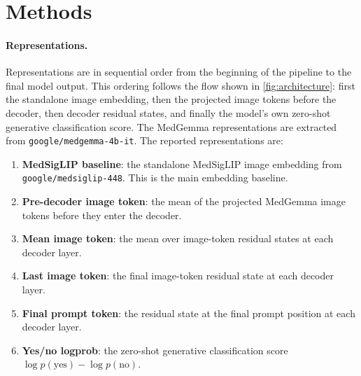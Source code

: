 \documentclass{article}
\begin{document}
\section{Methods}

\paragraph{Representations.}
Representations are in sequential order from the beginning of the pipeline to the final model output.
This ordering follows the flow shown in \cref{fig:architecture}: first the standalone image embedding, then the projected image tokens before the decoder, then decoder residual states, and finally the model's own zero-shot generative classification score.
The MedGemma representations are extracted from \texttt{google/medgemma-4b-it}.
The reported representations are:
\begin{enumerate}[leftmargin=*]
    \item \textbf{MedSigLIP baseline}: the standalone MedSigLIP image embedding from \texttt{google/medsiglip-448}. This is the main embedding baseline.
    \item \textbf{Pre-decoder image token}: the mean of the projected MedGemma image tokens before they enter the decoder.
    \item \textbf{Mean image token}: the mean over image-token residual states at each decoder layer.
    \item \textbf{Last image token}: the final image-token residual state at each decoder layer.
    \item \textbf{Final prompt token}: the residual state at the final prompt position at each decoder layer.
    \item \textbf{Yes/no logprob}: the zero-shot generative classification score $\log p(\textrm{yes}) - \log p(\textrm{no})$.
\end{enumerate}
\end{document}
